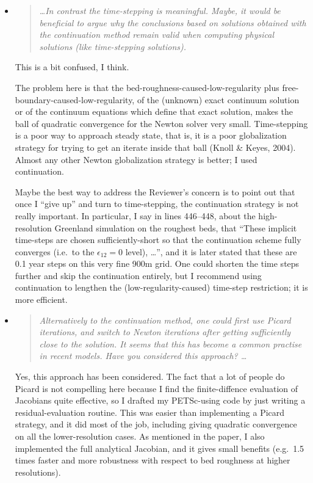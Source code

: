 \documentclass[11pt,reqno]{amsart}
\newcommand{\reply}[2]{
\medskip\medskip
\item  \begin{quote}
\emph{#1}
\end{quote}

\medskip
\noindent #2}
\begin{document}
\begin{itemize}
\reply{\dots  In contrast the time-stepping is meaningful.  Maybe,
it would be beneficial to argue why the conclusions based on solutions obtained
with the continuation method remain valid when computing physical solutions
(like time-stepping solutions).}
{This is a bit confused, I think.

The problem here is that the bed-roughness-caused-low-regularity plus free-boundary-caused-low-regularity, of the (unknown) exact continuum solution or of the continuum equations which define that exact solution, makes the ball of quadratic convergence for the Newton solver very small.  Time-stepping is a poor way to approach steady state, that is, it is a poor globalization strategy for trying to get an iterate inside that ball (Knoll \& Keyes, 2004).  Almost any other Newton globalization strategy is better; I used continuation.

Maybe the best way to address the Reviewer's concern is to point out that once I ``give up'' and turn to time-stepping, the continuation strategy is not really important.  In particular, I say in lines 446--448, about the high-resolution Greenland simulation on the roughest beds, that ``These implicit time-steps are chosen sufficiently-short so that the continuation scheme fully converges (i.e.~to the $\epsilon_{12}=0$ level), \dots'', and it is later stated that these are 0.1 year steps on this very fine 900m grid.  One could shorten the time steps further and skip the continuation entirely, but I recommend using continuation to lengthen the (low-regularity-caused) time-step restriction; it is more efficient.}

\reply{Alternatively to the continuation method, one could first use Picard iterations,
and switch to Newton iterations after getting sufficiently close to the solution.
It seems that this has become a common practise in recent models. Have you
considered this approach?  \dots}
{Yes, this approach has been considered.  The fact that a lot of people do Picard is not compelling here because I find the finite-diffence evaluation of Jacobians quite effective, so I drafted my PETSc-using code by just writing a residual-evaluation routine.  This was easier than implementing a Picard strategy, and it did most of the job, including giving quadratic convergence on all the lower-resolution cases.  As mentioned in the paper, I also implemented the full analytical Jacobian, and it gives small benefits (e.g.~1.5 times faster and more robustness with respect to bed roughness at higher resolutions).

}
\end{itemize}
\end{document}
